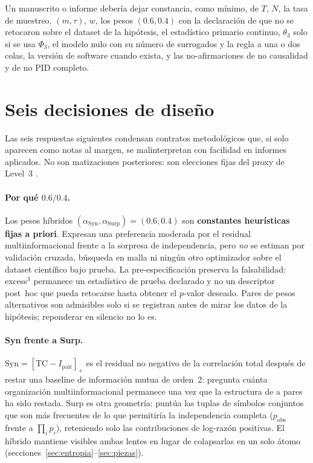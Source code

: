 \documentclass[11pt,a4paper]{article}
\begin{document}
Un manuscrito o informe deber\'ia dejar constancia, como m\'inimo, de $T$,
$N$, la tasa de muestreo, $(m,\tau)$, $w$, los pesos $(0.6,0.4)$ con la
declaraci\'on de que no se retocaron sobre el dataset de la hip\'otesis, el
estad\'istico primario continuo, $\theta_3$ solo si se usa $\Phi_3$, el
modelo nulo con su n\'umero de surrogados y la regla a una o dos colas, la
versi\'on de software cuando exista, y las no-afirmaciones de no causalidad
y de no PID completo.

\section{Seis decisiones de dise\~no}
\label{sec:diseno}

Las seis respuestas siguientes condensan contratos metodol\'ogicos que, si
solo aparecen como notas al margen, se malinterpretan con facilidad en
informes aplicados. No son matizaciones posteriores: son elecciones fijas
del proxy de Level~3 \citep{Padilla2026excess3}.

\paragraph{Por qu\'e $0.6/0.4$.}
Los pesos h\'ibridos
$(\alpha_{\mathrm{Syn}},\alpha_{\mathrm{Surp}})=(0.6,0.4)$ son
\textbf{constantes heur\'isticas fijas a priori}. Expresan una preferencia
moderada por el residual multiinformacional frente a la sorpresa de
independencia, pero \emph{no} se estiman por validaci\'on cruzada, b\'usqueda
en malla ni ning\'un otro optimizador sobre el dataset cient\'ifico bajo
prueba. La pre-especificaci\'on preserva la falsabilidad: excess$^3$
permanece un estad\'istico de prueba declarado y no un descriptor
post~hoc que pueda retocarse hasta obtener el $p$-valor deseado.
Pares de pesos alternativos son admisibles solo si se registran antes de
mirar los datos de la hip\'otesis; reponderar en silencio no lo es.

\paragraph{Syn frente a Surp.}
$\mathrm{Syn}=[\mathrm{TC}-I_{\mathrm{pair}}]_+$ es el residual no negativo
de la correlaci\'on total despu\'es de restar una baseline de informaci\'on
mutua de orden~2: pregunta cu\'anta organizaci\'on multiinformacional
permanece una vez que la estructura de a pares ha sido restada.
$\mathrm{Surp}$ es otra geometr\'ia: punt\'ua las tuplas de s\'imbolos
conjuntos que son m\'as frecuentes de lo que permitir\'ia la independencia
completa ($p_{\mathrm{obs}}$ frente a $\prod_i p_i$), reteniendo solo las
contribuciones de log-raz\'on positivas. El h\'ibrido mantiene visibles
ambas lentes en lugar de colapsarlas en un solo \'atomo
(secciones~\ref{sec:entropia}--\ref{sec:piezas}).
\end{document}
